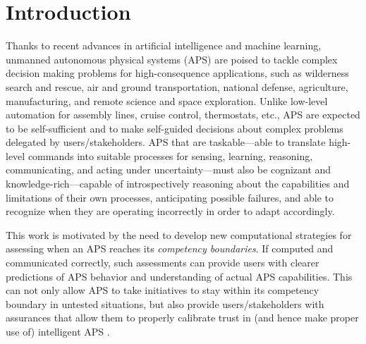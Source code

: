 \section{Introduction}

Thanks to recent advances in artificial intelligence and machine learning, unmanned autonomous physical systems (APS) are poised to tackle complex decision making problems for high-consequence applications, such as wilderness search and rescue, air and ground transportation, national defense, agriculture, manufacturing, and remote science and space exploration. 
Unlike low-level automation for assembly lines, cruise control, thermostats, etc., APS are expected to be self-sufficient and to make self-guided decisions about complex problems delegated by users/stakeholders. APS that are taskable---able to translate high-level commands into suitable processes for sensing, learning, reasoning, communicating, and acting under uncertainty---must also be cognizant and knowledge-rich---capable of introspectively reasoning about the capabilities and limitations of their own processes, anticipating possible failures, and able to recognize when they are operating incorrectly in order to adapt accordingly. %

This work is motivated by the need to develop new computational strategies for assessing when an APS reaches its \emph{competency boundaries}. If computed and communicated correctly, such assessments can provide users with clearer predictions of APS behavior and understanding of actual APS capabilities. This can not only allow APS to take initiatives to stay within its competency boundary in untested situations, but also provide users/stakeholders with assurances that allow them to properly calibrate trust in (and hence make proper use of) intelligent APS \cite{Israelsen2018-es}. 

